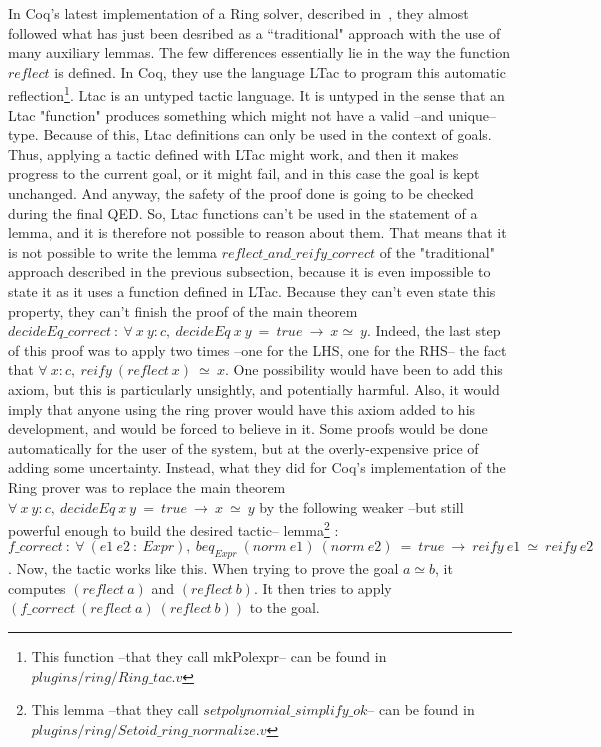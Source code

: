 In Coq's latest implementation of a Ring solver, described in~\cite{Coq2005}, they almost followed what has just been desribed as a ``traditional" approach with the use of many auxiliary lemmas. The few differences essentially lie in the way the function $reflect$ is defined. In Coq, they use the language LTac to program this automatic reflection\footnote{This function --that they call mkPolexpr-- can be found in $plugins/ring/Ring\_tac.v$}. Ltac is an untyped tactic language. It is untyped in the sense that an Ltac "function" produces something which might not have a valid  --and unique-- type. Because of this, Ltac definitions can only be used in the context of goals. Thus, applying a tactic defined with LTac might work, and then it makes progress to the current goal, or it might fail, and in this case the goal is kept unchanged. And anyway, the safety of the proof done is going to be checked during the final QED. So, Ltac functions can't be used in the statement of a lemma, and it is therefore not possible to reason about them. That means that it is not possible to write the lemma $reflect\_and\_reify\_correct$ of the "traditional" approach described in the previous subsection, because it is even impossible to state it as it uses a function defined in LTac. Because they can't even state this property, they can't finish the proof of the main theorem $decideEq\_correct\ :\ \forall\  x\ y:c,\ decideEq\ x\ y\ =\ true\ \rightarrow\ x \simeq\ y$. Indeed, the last step of this proof was to apply two times --one for the LHS, one for the RHS-- the fact that $\forall\ x:c,\ reify\ (reflect\ x)\ \simeq\ x$. One possibility would have been to add this axiom, but this is particularly unsightly, and potentially harmful. Also, it would imply that anyone using the ring prover would have this axiom added to his development, and would be forced to believe in it. Some proofs would be done automatically for the user of the system, but at the overly-expensive price of adding some uncertainty.
Instead, what they did for Coq's implementation of the Ring prover was to replace the main theorem $\forall\  x\ y:c,\ decideEq\ x\ y\ =\ true\ \rightarrow\ x\ \simeq\ y$ by the following weaker --but still powerful enough to build the desired tactic-- lemma\footnote{This lemma --that they call $setpolynomial\_simplify\_ok$-- can be found in $plugins/ring/Setoid\_ring\_normalize.v$}  : $f\_correct\ :\ \forall\ (e1\ e2\ :\ Expr),\ beq_{Expr}\ (norm\ e1)\ (norm\ e2)\ =\ true\ \rightarrow\ reify\ e1\ \simeq\ reify\ e2$.
Now, the tactic works like this. When trying to prove the goal $a \simeq b$, it computes $(reflect\ a)$ and $(reflect\ b)$. It then tries to apply $(f\_correct\ (reflect\ a)\ (reflect\ b))$ to the goal. 
